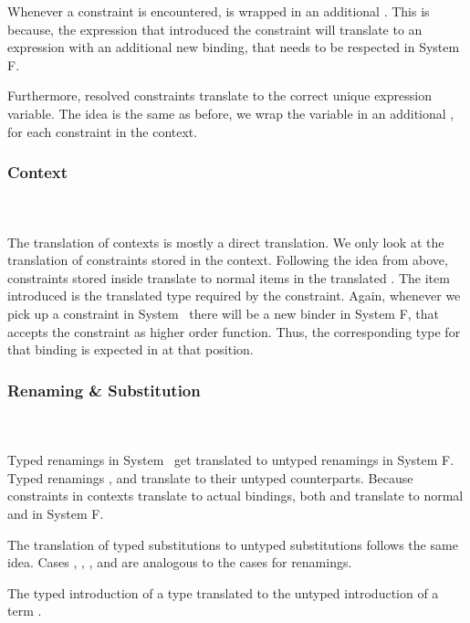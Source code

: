 \noindent Whenever a constraint is encountered,  is wrapped in an additional . 
This is because, the expression that introduced the constraint will translate to an expression with an additional new binding, that needs to be respected in System F.

\noindent Furthermore, resolved constraints translate to the correct unique expression variable. 
\DPTOVar
The idea is the same as before, we wrap the variable in an additional , for each constraint in the context.

\subsubsection{Context}\hfill\\\\
The translation of contexts is mostly a direct translation. 
We only look at the translation of constraints stored in the context.
\DPTCtx
Following the idea from above, constraints  \Constr{:}  stored inside  translate to normal items in the translated . 
The item introduced is the translated type   required by the constraint. Again, whenever we pick up a constraint in System \Fo\, there will be a new binder in System F, that accepts the constraint as higher order function. 
Thus, the corresponding type for that binding is expected in  at that position.

\subsubsection{Renaming \& Substitution}\hfill\\\\
Typed renamings in System \Fo\ get translated to untyped renamings in System F.
\DPTRen
Typed renamings ,  and  translate to their untyped counterparts. 
\noindent Because constraints in contexts translate to actual bindings, both  and  translate to normal  and  in System F.

\noindent The translation of typed substitutions to untyped substitutions follows the same idea.
\DPTSub 
Cases , , ,  and  are analogous to the cases for renamings. 

\noindent The typed introduction of a type  translated to the untyped introduction of a term .

